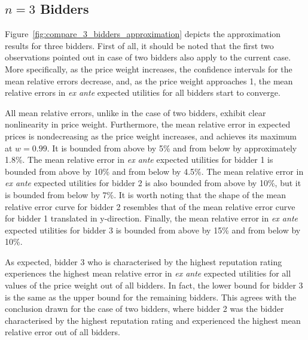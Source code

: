 \subsection{$n=3$ Bidders} %
\label{sub:n_3_bidders_approximation}
Figure~\ref{fig:compare_3_bidders_approximation} depicts the approximation results for three bidders. First of all, it should be noted that the first two observations pointed out in case of two bidders also apply to the current case. More specifically, as the price weight increases, the confidence intervals for the mean relative errors decrease, and, as the price weight approaches 1, the mean relative errors in \emph{ex ante} expected utilities for all bidders start to converge.

All mean relative errors, unlike in the case of two bidders, exhibit clear nonlinearity in price weight. Furthermore, the mean relative error in expected prices is nondecreasing as the price weight increases, and achieves its maximum at $w = 0.99$. It is bounded from above by 5\% and from below by approximately 1.8\%. The mean relative error in \emph{ex ante} expected utilities for bidder 1 is bounded from above by 10\% and from below by 4.5\%. The mean relative error in \emph{ex ante} expected utilities for bidder 2 is also bounded from above by 10\%, but it is bounded from below by 7\%. It is worth noting that the shape of the mean relative error curve for bidder 2 resembles that of the mean relative error curve for bidder 1 translated in y-direction. Finally, the mean relative error in \emph{ex ante} expected utilities for bidder 3 is bounded from above by 15\% and from below by 10\%.

As expected, bidder 3 who is characterised by the highest reputation rating experiences the highest mean relative error in \emph{ex ante} expected utilities for all values of the price weight out of all bidders. In fact, the lower bound for bidder 3 is the same as the upper bound for the remaining bidders. This agrees with the conclusion drawn for the case of two bidders, where bidder 2 was the bidder characterised by the highest reputation rating and experienced the highest mean relative error out of all bidders.

